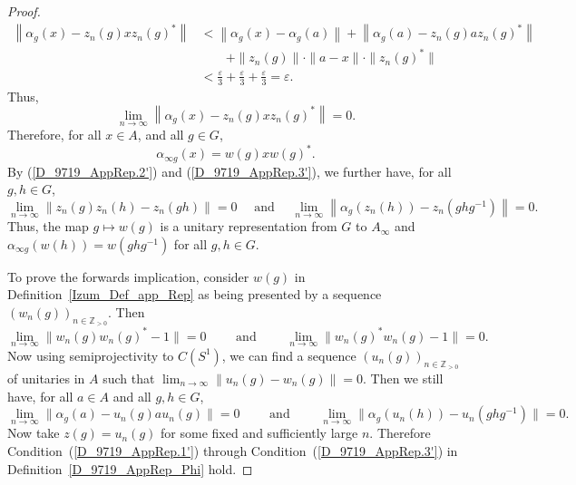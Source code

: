 \documentclass[10pt]{amsart}
\numberwithin{equation}{section}
\theoremstyle{definition}
\newcommand{\ep}{\varepsilon}
\newcommand{\N}{{\mathbb{Z}}_{> 0}}
\begin{document}
\begin{proof}
\begin{align*}
\left\| \alpha_{g} (x) - z_{n}(g) x z_{n}(g)^*\right\|
&<
\left\| \alpha_{g} (x) - \alpha_g (a)\right\|
+
\left\| \alpha_{g} (a) - z_{n}(g) a z_{n}(g)^*\right\|
\\
& \qquad+
\|z_{n}(g)\| \cdot \|  a  -  x \| \cdot \|z_{n}(g)^*\|
\\
&<
\frac{\ep}{3} + \frac{\ep}{3} + \frac{\ep}{3} =\ep.
\end{align*}
Thus,
\[
\lim_{n \to \infty}
 \left\| \alpha_{g} (x) - z_{n}(g) x z_{n}(g)^*\right\|=0.
 \]
Therefore, for all $x \in A$, and all $g \in G$,
\[
\alpha_{\infty g} (x) = w(g) x w(g)^*.
\]
By (\ref{D_9719_AppRep.2'}) and (\ref{D_9719_AppRep.3'}), we further have, for all $g, h \in G$,
\[
\lim_{n \to \infty}
 \left\| z_{n}(g) z_{n}(h) - z_{n}(gh)\right\|=0
\quad 
\mbox{ and }
\quad 
\lim_{n \to \infty}
 \left\| \alpha_{g} (z_n (h)) - z_{n}(g h g^{-1})\right\|=0.
 \]
Thus, the map $g \mapsto w(g)$ is a unitary representation from $G$ to $A_{\infty}$ and 
$\alpha_{\infty g} (w(h)) = w(g h g^{-1})$ for all $g, h \in G$. 

To prove the forwards implication, consider $w(g)$ in Definition~\ref{Izum_Def_app_Rep} 
as being presented by a sequence $(w_n (g))_{n \in \N}$.
Then 
\[
\lim_{n \to \infty} \|w_n(g) w_n (g)^* -1 \|=0
\qquad
\mbox{ and }
\qquad
\lim_{n \to \infty} \|w_n (g)^* w_n(g) -1 \|=0.
\]
Now using semiprojectivity to $C(S^1)$, we can find a sequence $(u_n (g))_{n \in \N}$ of unitaries in $A$ such that
$\lim_{n \to \infty} \|u_n(g) - w_n(g)\|=0$.
Then we still have, for all $a \in A$ and all $g, h\in G$,
\[
\lim_{n \to \infty} \| \alpha_{g} (a) - u_n (g) a u_n (g)\|=0
\qquad
\mbox{ and }
\qquad
\lim_{n \to \infty} \| \alpha_{g} (u_n (h)) - u_n (g h g^{-1})\|=0.
\]
Now take $z(g)= u_n (g)$ for some fixed and sufficiently large $n$.
Therefore Condition~(\ref{D_9719_AppRep.1'}) through Condition~(\ref{D_9719_AppRep.3'})
 in Definition~\ref{D_9719_AppRep_Phi} hold.
\end{proof}
%
%
\end{document}
